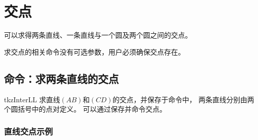 \documentclass[../main.tex]{subfiles}
\begin{document}
\section{交点}

可以求得两条直线、一条直线与一个圆及两个圆之间的交点。

求交点的相关命令没有可选参数，用户必须确保交点存在。

\subsection{命令：求两条直线的交点}

\begin{NewMacroBox}{tkzInterLL}{}%
求直线$(AB)$和$(CD)$的交点，并保存于命令中，
两条直线分别由两个圆括号中的点对定义。
可以通过保存并命令交点。
\end{NewMacroBox}

\subsubsection{直线交点示例}

\begin{tkzexample}[latex=7cm,small]
\end{tkzexample}
\end{document}
